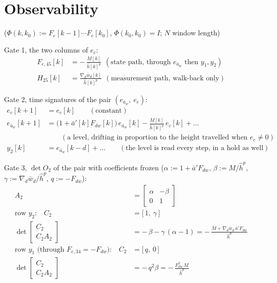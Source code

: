 \documentclass[11pt,a4paper,fontset=none]{ctexart}
\newcommand{\ba}{\bar{a}}
\newcommand{\bw}{\bar{w}}
\newcommand{\ap}{\ba'}
\newcommand{\hh}{\hat{h}}
\begin{document}
\clearpage
\section{Observability}

($\Phi(k,k_0) := F_e[k-1]\cdots F_e[k_0]$, $\Phi(k_0,k_0) = I$; $N$ window length)

Gate 1, the two columns of $e_c$:
\begin{align*}
F_{e,45}[k] &= -\,\frac{M[k]}{\hh[k]^{p}} \ \ (\text{state path, through } e_{\ba_w} \text{ then } y_1, y_2) \\
H_{25}[k]   &= \frac{\nabla_d\bw_d[k]}{\hh[k]^{p}} \ \ (\text{measurement path, walk-back only})
\end{align*}

Gate 2, time signatures of the pair $(e_{\ba_w},\ e_c)$:
\begin{align*}
e_c[k+1]       &= e_c[k] \qquad(\text{constant}) \\
e_{\ba_w}[k+1] &= \bigl(1 + \ap[k]F_{dw}[k]\bigr)\,e_{\ba_w}[k] - \frac{M[k]}{\hh[k]^{p}}\,e_c[k] + \dots \\
               &\qquad(\text{a level, drifting in proportion to the height travelled when } e_c \ne 0) \\
y_2[k]         &= e_{\ba_w}[k-d] + \dots \qquad(\text{the level is read every step, in a hold as well})
\end{align*}

Gate 3, $\det O_2$ of the pair with coefficients frozen ($\alpha := 1 + \ap F_{dw}$, $\beta := M/\hh^{p}$, $\gamma := \nabla_d\bw_d/\hh^{p}$, $q := -F_{dw}$):
\begin{align*}
A_2 &= \begin{bmatrix} \alpha & -\beta \\ 0 & 1 \end{bmatrix} \\[4pt]
\text{row } y_2\text{:}\quad C_2 &= \bigl[\,1,\ \gamma\,\bigr] \\
\det\begin{bmatrix} C_2 \\ C_2A_2 \end{bmatrix} &= -\,\beta - \gamma\,(\alpha - 1) = -\,\frac{M + \nabla_d\bw_d\,\ap F_{dw}}{\hh^{p}} \\[4pt]
\text{row } y_1 \text{ (through } F_{e,34} = -F_{dw}\text{):}\quad C_2 &= \bigl[\,q,\ 0\,\bigr] \\
\det\begin{bmatrix} C_2 \\ C_2A_2 \end{bmatrix} &= -\,q^{2}\beta = -\,\frac{F_{dw}^{2}\,M}{\hh^{p}}
\end{align*}
\end{document}
